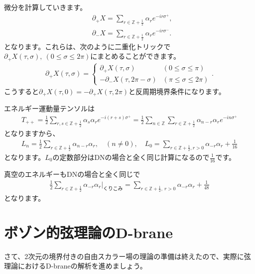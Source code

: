 \documentclass[report,paper=a4, fontsize=12pt, line_length=16cm, number_of_lines=34,dvipdfmx]{jlreq}
\numberwithin{equation}{chapter}
\numberwithin{equation}{section}
\newcommand{\Zb}{\mathbb{Z}}
\newcommand{\del}{\partial}
\newcommand{\Zbh}{\Zb+\frac12}
\begin{document}
微分を計算していきます。
\begin{align}
  &\del_{+}X=\sum_{r\in \Zbh}\alpha_{r}e^{-ir\sigma^{+}},\\
  &\del_{-}X=\sum_{r\in \Zbh}\alpha_{r}e^{-ir\sigma^{-}}.
\end{align}
となります。これらは、次のように二重化トリックで$\del_{+}X(\tau,\sigma),\ (0\le \sigma \le 2\pi)$にまとめることができます。
\begin{align}
  \del_{+}X(\tau,\sigma)=
  \begin{cases}
    \del_{+}X(\tau,\sigma)& (0\le \sigma \le \pi)\\
    -\del_{-}X(\tau,2\pi-\sigma) & (\pi\le \sigma \le 2\pi)
  \end{cases}.
\end{align}
こうすると$\del_{+}X(\tau,0)=-\del_{+}X(\tau,2\pi)$と反周期境界条件になります。

エネルギー運動量テンソルは
\begin{align}
  T_{++}
  =\frac12 \sum_{r,s\in \Zbh}\alpha_{s}\alpha_{r} e^{-i(r+s)\sigma^{+}}
  =\frac12 \sum_{n\in\Zb}\sum_{r\in \Zbh}\alpha_{n-r}\alpha_{r} e^{-in\sigma^{+}}
\end{align}
となりますから、
\begin{align}
  L_{n}=\frac12 \sum_{r\in \Zbh}
  \alpha_{n-r}\alpha_{r},\quad (n\ne 0),\quad
  L_{0}=\sum_{r\in \Zbh,r>0}\alpha_{-r}\alpha_{r}+\frac{1}{16}
\end{align}
となります。$L_0$の定数部分はDNの場合と全く同じ計算になるので$\frac{1}{16}$です。

真空のエネルギーもDNの場合と全く同じで
\begin{align}
  \frac12 \sum_{r\in \Zbh}\alpha_{-r}\alpha_{r}\Bigg|_{\text{くりこみ}}
  =
  \sum_{r\in \Zbh,\ r>0}\alpha_{-r}\alpha_{r}
  +\frac{1}{48}
\end{align}
となります。

\section{ボゾン的弦理論のD-brane}
さて、2次元の境界付きの自由スカラー場の理論の準備は終えたので、実際に弦理論におけるD-braneの解析を進めましょう。
\end{document}
